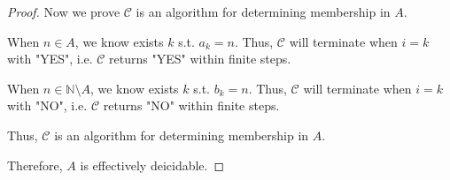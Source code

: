 \documentclass{article}
\begin{document}
\begin{proof}
    \vspace{-0.9em} \hspace{1.3em}
    Now we prove $\mathcal{C}$ is an algorithm for determining membership in $A$.

    \hspace{1.3em}
    When $n\in A$, we know exists $k$ s.t. $a_k=n$. Thus, $\mathcal{C}$ will terminate when $i=k$ with "YES", i.e. $\mathcal{C}$ returns "YES" within finite steps.

    \hspace{1.3em}
    When $n\in\mathbb{N}\setminus A$, we know exists $k$ s.t. $b_k=n.$ Thus, $\mathcal{C}$ will terminate when $i=k$ with "NO", i.e. $\mathcal{C}$ returns "NO" within finite steps.

    \hspace{1.3em}
    Thus, $\mathcal{C}$ is an algorithm for determining membership in $A$.

    \hspace{1.3em}
    Therefore, $A$ is effectively deicidable.
\end{proof}

\vspace{5em}
\end{document}
